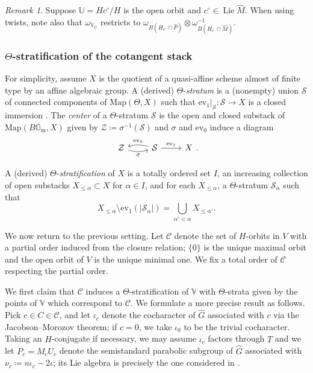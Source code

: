 \documentclass{amsart}
\theoremstyle{definition}
\theoremstyle{remark}
\newtheorem{remark}[theorem]{Remark}
\numberwithin{equation}{section}
\DeclareMathOperator{\Lie}{Lie}
\newcommand{\U}{\mathbb{U}}
\newcommand{\mc}{\mathcal}
\newcommand{\Gm}{{\mathbb{G}_{\mathrm{m}}}}
\newcommand{\wh}{\widehat}
\newcommand{\V}{\mathbb{V}}
\newcommand{\Map}{\mathrm{Map}}
\newcommand{\ev}{\mathrm{ev}}
\begin{document}
\begin{remark}
Suppose $\U=Hc^\circ /H$ is the open orbit and $c^\circ \in \Lie \wh M$. When using twists, note also that $\omega_{\V_U}$ restricts to $\omega_{B(H_{c^\circ} \cap \wh P)}\otimes \omega_{B(H_{c^\circ} \cap \wh M)}^{-1}$. 
\end{remark}

\subsubsection{$\Theta$-stratification of the cotangent stack}\label{sss:ThetaStratificationCotangent}
For simplicity, assume $X$ is the quotient of a quasi-affine scheme almost of finite type by an affine algebraic group. 
A (derived) $\Theta$-\emph{stratum} is a (nonempty) union $\mc{S}$ of connected components of $\Map(\Theta, X)$ such that $\ev_1|_{\mc{S}}: \mc{S} \rightarrow X$ is a closed immersion \cite[Definition 1.2.2]{HalpernLeistner}. The \emph{center} of a $\Theta$-stratum $\mc{S}$ is the open and closed substack of $\Map(B\Gm, X)$ given by $\mc{Z} \coloneq \sigma^{-1}(\mc{S})$ and $\sigma$ and $\ev_0$ induce a diagram 
\begin{equation*}
    \begin{tikzcd}
        \mc{Z} \arrow[r, swap, bend right=15, "{\sigma}"] & \mc{S} \arrow[r, "{\ev_1}"] \arrow[l,swap, bend right=15, "{\ev_0}"] & X
    \end{tikzcd}.
\end{equation*}

A (derived) $\Theta$-\emph{stratification} of $X$ \cite[Definition 2.3.1]{HalpernLeistner} is a totally ordered set $I$, an increasing collection of open substacks $X_{\leq \alpha} \subset X$ for $\alpha \in I$, and for each $X_{\leq \alpha}$, a $\Theta$-stratum $\mc{S}_{\alpha}$ such that 
\begin{equation*}
   X_{\leq \alpha} \setminus \ev_1(|\mc{S}_{\alpha}|) = \bigcup\limits_{\alpha' < \alpha} X_{\leq \alpha'}. 
\end{equation*}

We now return to the previous setting. Let $\mathcal{C}$ denote the set of $H$-orbits in $V$ with a partial order induced from the closure relation; $\{0\}$ is the unique maximal orbit and the open orbit of $V$ is the unique minimal one. We fix a total order of $\mathcal{C}$ respecting the partial order.

We first claim that $\mathcal{C}$ induces a $\Theta$-stratification of $\V$ with $\Theta$-strata given by the points of $\V$ which correspond to $\mathcal{C}$. We formulate a more precise result as follows. Pick $c \in C \in \mathcal{C}$, and let $\iota_c$ denote the cocharacter of $\wh{G}$ associated with $c$ via the Jacobson--Morozov theorem; if $c=0$, we take $\iota_0$ to be the trivial cocharacter. Taking an $H$-conjugate if necessary, we may assume $\iota_c$ factors through $\wh T$ and we let $P_c=M_c U_c$ denote the semistandard parabolic subgroup of $\wh{G}$ associated with $\nu_c \coloneq n\iota_c - 2\iota$; its Lie algebra is precisely the one considered in \cite[\S 5]{LusztigGraded}. 
\end{document}
